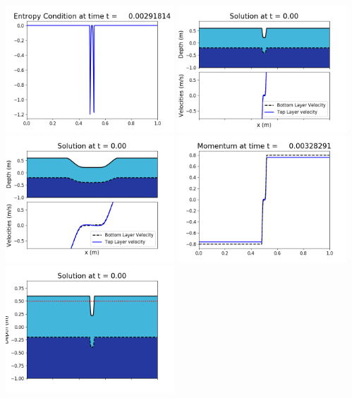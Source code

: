 \documentclass[11pt]{article}
\begin{document}
\vskip 10pt 
\includegraphics[width=0.475\textwidth]{frame0009fig1009.png}
\vskip 10pt 
\includegraphics[width=0.475\textwidth]{frame0010fig1001.png}
\includegraphics[width=0.475\textwidth]{frame0010fig1002.png}
\vskip 10pt 
\includegraphics[width=0.475\textwidth]{frame0010fig1003.png}
\includegraphics[width=0.475\textwidth]{frame0010fig1006.png}
\end{document}
